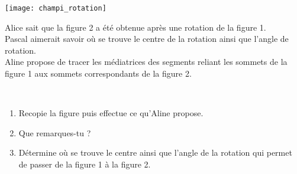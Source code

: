 \begin{activite}
\begin{partie}
\vspace{.5em}
 \begin{minipage}[c]{0.28\linewidth}
  \texttt{[image: champi\_rotation]}
  \end{minipage} \hfill%
  \begin{minipage}[c]{0.58\linewidth}
Alice sait que la figure 2 a été obtenue après une rotation de la figure 1. \\[0.5em]
Pascal aimerait savoir où se trouve le centre de la rotation ainsi que l'angle de rotation. \\[0.5em]
Aline propose de tracer les médiatrices des segments reliant les sommets de la figure 1 aux sommets correspondants de la figure 2.
  \end{minipage} \\
\begin{enumerate}
 \item Recopie la figure puis effectue ce qu'Aline propose.
 \item Que remarques-tu ?
 \item Détermine où se trouve le centre ainsi que l'angle de la rotation qui permet de passer de la figure 1 à la figure 2.
 \end{enumerate}
\end{partie}

\end{activite}

